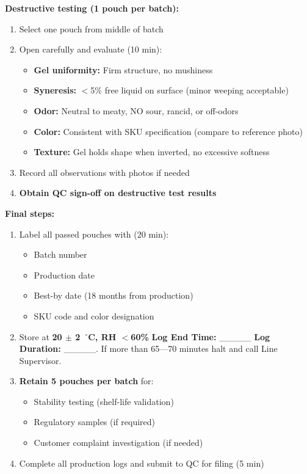 {\textbf{Destructive testing (1 pouch per batch):}
\begin{enumerate}[resume,leftmargin=1.5em]
\item Select one pouch from middle of batch
\item Open carefully and evaluate (10 min):
  \begin{itemize}
  \item \textbf{Gel uniformity:} Firm structure, no mushiness
  \item \textbf{Syneresis:} $<$5\% free liquid on surface (minor weeping acceptable)
  \item \textbf{Odor:} Neutral to meaty, NO sour, rancid, or off-odors
  \item \textbf{Color:} Consistent with SKU specification (compare to reference photo)
  \item \textbf{Texture:} Gel holds shape when inverted, no excessive softness
  \end{itemize}
\item Record all observations with photos if needed
\item \textbf{Obtain QC sign-off on destructive test results}
\end{enumerate}

\textbf{Final steps:}
\begin{enumerate}[resume,leftmargin=1.5em]
\item Label all passed pouches with (20 min):
  \begin{itemize}
  \item Batch number
  \item Production date
  \item Best-by date (18 months from production)
  \item SKU code and color designation
  \end{itemize}
\item Store at \textbf{20 $\pm$ 2~$^\circ$C, RH $<$60\%}
\textbf{Log End Time:} \_\_\_\_\_
\textbf{Log Duration:} \_\_\_\_\_. If more than 65---70 minutes halt and call Line Supervisor.

\item \textbf{Retain 5 pouches per batch} for:
  \begin{itemize}
  \item Stability testing (shelf-life validation)
  \item Regulatory samples (if required)
  \item Customer complaint investigation (if needed)
  \end{itemize}
\item Complete all production logs and submit to QC for filing (5 min)
\end{enumerate}

}
